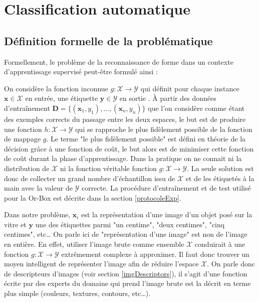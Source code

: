     \section{Classification automatique}
        \subsection{Définition formelle de la problématique}
        
        Formellement, le problème de la reconnaissance de forme dans un contexte d'apprentissage supervisé peut-être formulé ainsi :
        
        On considère la fonction inconnue $g:\mathcal{X}\rightarrow\mathcal{Y}$ qui définit pour chaque instance $\boldsymbol{x} \in \mathcal{X}$ en entrée, une étiquette $\boldsymbol{y} \in \mathcal{Y}$ en sortie .
        À partir des données d'entraînement $\mathbf{D} = \{(\boldsymbol{x}_1,y_1),\dots,(\boldsymbol{x}_n, y_n)\}$ que l'on considère comme étant des exemples corrects du passage entre les deux espaces, le but est de produire une fonction $h:\mathcal{X}\rightarrow\mathcal{Y}$ qui se rapproche le plus fidèlement possible de la fonction de mappage $g$.
        Le terme "le plus fidèlement possible" est défini en théorie de la décision grâce à une fonction de coût, le but alors est de minimiser cette fonction de coût durant la phase d'apprentissage.
        Dans la pratique on ne connait ni la distribution de $\mathcal{X}$ ni la fonction véritable fonction $g:\mathcal{X}\rightarrow\mathcal{Y}$.
        La seule solution est donc de collecter un grand nombre d'échantillon issu de $\mathcal{X}$ et de les étiquetés à la main avec la valeur de $\mathcal{Y}$ correcte.
        La procédure d'entraînement et de test utilisé pour la Or-Box est décrite dans la section \ref{protocoleExp}.
        
        Dans notre problème, $\boldsymbol{x}_i$ est la représentation d'une image d'un objet posé sur la vitre et $\boldsymbol{y}$ une des étiquettes parmi "un centime", "deux centimes", "cinq centimes", etc\dots
        On parle ici de "représentation d'une image" est non de l'image en entière.
        En effet, utiliser l'image brute comme ensemble $\mathcal{X}$ conduirait à une fonction $g:\mathcal{X}\rightarrow\mathcal{Y}$ extrêmement complexe à approximer.
        Il faut donc trouver un moyen intelligent de représenter l'image afin de réduire l'espace $\mathcal{X}$.
        On parle donc de descripteurs d'images (voir section  \ref{imgDescriptors}), il s'agit d'une fonction écrite par des experts du domaine qui prend l'image brute est la décrit en terme plus simple (couleurs, textures, contours, etc\dots). 
        
